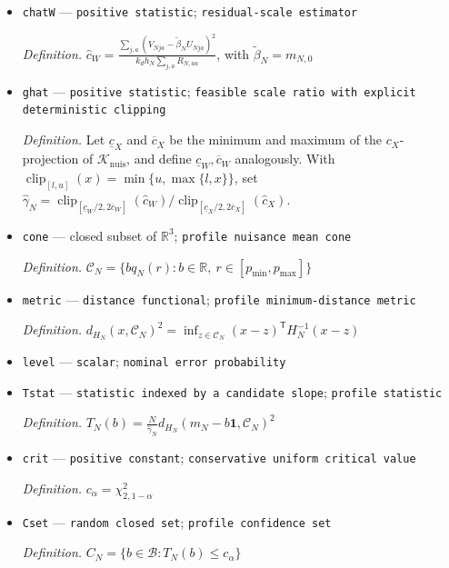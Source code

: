 \documentclass{article}
\begin{document}
\begin{itemize}
  \par\smallskip\noindent\emph{Definition.} \(\widehat c_X=\frac{\sum_{j,a}U_{Nja}^2}{k_dh_N\sum_{j,a}R_{N,aa}}\)
  \item \texttt{chatW} --- \texttt{positive statistic}; \texttt{residual-\allowbreak{}scale estimator}
  \par\smallskip\noindent\emph{Definition.} \(\widehat c_W=\frac{\sum_{j,a}(V_{Nja}-\widetilde\beta_NU_{Nja})^2}{k_dh_N\sum_{j,a}R_{N,aa}}\), with \(\widetilde\beta_N=m_{N,0}\)
  \item \texttt{ghat} --- \texttt{positive statistic}; \texttt{feasible scale ratio with explicit deterministic clipping}
  \par\smallskip\noindent\emph{Definition.} Let \(\underline c_X\) and \(\overline c_X\) be the minimum and maximum of the \(c_X\)-projection of \(\mathcal K_{\mathrm{nuis}}\), and define \(\underline c_W,\overline c_W\) analogously. With \(\operatorname{clip}_{[l,u]}(x)=\min\{u,\max\{l,x\}\}\), set \(\widehat\gamma_N=\operatorname{clip}_{[\underline c_W/2,2\overline c_W]}(\widehat c_W)/\operatorname{clip}_{[\underline c_X/2,2\overline c_X]}(\widehat c_X)\).
  \item \texttt{cone} --- closed subset of \(\mathbb R^3\); \texttt{profile nuisance mean cone}
  \par\smallskip\noindent\emph{Definition.} \(\mathcal C_N=\{bq_N(r):b\in\mathbb R,\ r\in[p_{\min},p_{\max}]\}\)
  \item \texttt{metric} --- \texttt{distance functional}; \texttt{profile minimum-\allowbreak{}distance metric}
  \par\smallskip\noindent\emph{Definition.} \(d_{H_N}(x,\mathcal C_N)^2=\inf_{z\in\mathcal C_N}(x-z)^{\mathsf T}H_N^{-1}(x-z)\)
  \item \texttt{level} --- \texttt{scalar}; \texttt{nominal error probability}
  \item \texttt{Tstat} --- \texttt{statistic indexed by a candidate slope}; \texttt{profile statistic}
  \par\smallskip\noindent\emph{Definition.} \(T_N(b)=\frac{N}{\widehat\gamma_N}d_{H_N}(m_N-b\mathbf 1,\mathcal C_N)^2\)
  \item \texttt{crit} --- \texttt{positive constant}; \texttt{conservative uniform critical value}
  \par\smallskip\noindent\emph{Definition.} \(c_{\alpha}=\chi^2_{2,1-\alpha}\)
  \item \texttt{Cset} --- \texttt{random closed set}; \texttt{profile confidence set}
  \par\smallskip\noindent\emph{Definition.} \(C_N=\{b\in\mathcal B:T_N(b)\le c_{\alpha}\}\)

\end{itemize}
\end{document}
